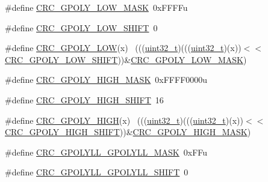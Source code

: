 \begin{DoxyCompactItemize}
\item 
\#define \hyperlink{group___c_r_c___register___masks_ga861d4f6f458051a63a7b01e6e5d8794b}{C\+R\+C\+\_\+\+G\+P\+O\+L\+Y\+\_\+\+L\+O\+W\+\_\+\+M\+A\+SK}~0x\+F\+F\+F\+Fu
\item 
\#define \hyperlink{group___c_r_c___register___masks_ga3830f95399bd5190027aaf00f307d10b}{C\+R\+C\+\_\+\+G\+P\+O\+L\+Y\+\_\+\+L\+O\+W\+\_\+\+S\+H\+I\+FT}~0
\item 
\#define \hyperlink{group___c_r_c___register___masks_ga8ca8f0515fe1c754a85c9675a72724a2}{C\+R\+C\+\_\+\+G\+P\+O\+L\+Y\+\_\+\+L\+OW}(x)                                              ~(((\hyperlink{_p_e___types_8h_a33594304e786b158f3fb30289278f5af}{uint32\+\_\+t})(((\hyperlink{_p_e___types_8h_a33594304e786b158f3fb30289278f5af}{uint32\+\_\+t})(x))$<$$<$\hyperlink{group___c_r_c___register___masks_ga3830f95399bd5190027aaf00f307d10b}{C\+R\+C\+\_\+\+G\+P\+O\+L\+Y\+\_\+\+L\+O\+W\+\_\+\+S\+H\+I\+FT}))\&\hyperlink{group___c_r_c___register___masks_ga861d4f6f458051a63a7b01e6e5d8794b}{C\+R\+C\+\_\+\+G\+P\+O\+L\+Y\+\_\+\+L\+O\+W\+\_\+\+M\+A\+SK})
\item 
\#define \hyperlink{group___c_r_c___register___masks_ga96c07e55f3d3c43d7b3e7637bc854ed6}{C\+R\+C\+\_\+\+G\+P\+O\+L\+Y\+\_\+\+H\+I\+G\+H\+\_\+\+M\+A\+SK}~0x\+F\+F\+F\+F0000u
\item 
\#define \hyperlink{group___c_r_c___register___masks_ga991debc471e54dcf5297d6a42c5778e6}{C\+R\+C\+\_\+\+G\+P\+O\+L\+Y\+\_\+\+H\+I\+G\+H\+\_\+\+S\+H\+I\+FT}~16
\item 
\#define \hyperlink{group___c_r_c___register___masks_ga90a11ee1325340cc0d7e18d791814a36}{C\+R\+C\+\_\+\+G\+P\+O\+L\+Y\+\_\+\+H\+I\+GH}(x)                                            ~(((\hyperlink{_p_e___types_8h_a33594304e786b158f3fb30289278f5af}{uint32\+\_\+t})(((\hyperlink{_p_e___types_8h_a33594304e786b158f3fb30289278f5af}{uint32\+\_\+t})(x))$<$$<$\hyperlink{group___c_r_c___register___masks_ga991debc471e54dcf5297d6a42c5778e6}{C\+R\+C\+\_\+\+G\+P\+O\+L\+Y\+\_\+\+H\+I\+G\+H\+\_\+\+S\+H\+I\+FT}))\&\hyperlink{group___c_r_c___register___masks_ga96c07e55f3d3c43d7b3e7637bc854ed6}{C\+R\+C\+\_\+\+G\+P\+O\+L\+Y\+\_\+\+H\+I\+G\+H\+\_\+\+M\+A\+SK})
\item 
\#define \hyperlink{group___c_r_c___register___masks_ga659c987f1e9d74e32d16e4b69bd763ee}{C\+R\+C\+\_\+\+G\+P\+O\+L\+Y\+L\+L\+\_\+\+G\+P\+O\+L\+Y\+L\+L\+\_\+\+M\+A\+SK}~0x\+F\+Fu
\item 
\#define \hyperlink{group___c_r_c___register___masks_ga1a323693acd9a37bb90abdc7f16ebbd8}{C\+R\+C\+\_\+\+G\+P\+O\+L\+Y\+L\+L\+\_\+\+G\+P\+O\+L\+Y\+L\+L\+\_\+\+S\+H\+I\+FT}~0

\end{DoxyCompactItemize}
